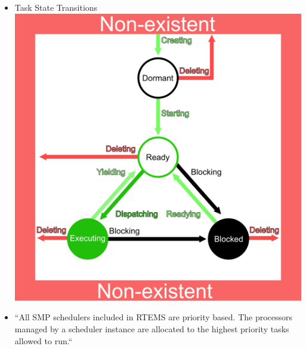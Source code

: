 \begin{itemize}
    \item
      Task State Transitions \cite[\S5.2.5]{RTEMS:CUSER}
      \\
      \includegraphics[scale=0.3]{images/states.png}
    \item
      ``All SMP schedulers included in RTEMS are priority based. 
       The processors managed by a scheduler instance are allocated 
       to the highest priority tasks allowed to run.``
      \cite[\S5.4]{RTEMS:CUSER}
\end{itemize}



